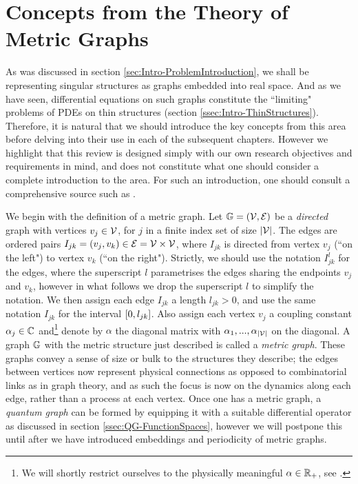 \section{Concepts from the Theory of Metric Graphs} \label{sec:QuantumGraphs}
As was discussed in section \ref{sec:Intro-ProblemIntroduction}, we shall be representing singular structures as graphs embedded into real space.
And as we have seen, differential equations on such graphs constitute the ``limiting" problems of PDEs on thin structures (section \ref{ssec:Intro-ThinStructures}).
Therefore, it is natural that we should introduce the key concepts from this area before delving into their use in each of the subsequent chapters.
However we highlight that this review is designed simply with our own research objectives and requirements in mind, and does not constitute what one should consider a complete introduction to the area.
For such an introduction, one should consult a comprehensive source such as \cite{berkolaiko2013introduction}.

We begin with the definition of a metric graph.
Let $\mathbb{G}=\left( \mathcal{V},\mathcal{E} \right)$ be a \emph{directed} graph with vertices $v_j\in \mathcal{V}$, for $j$ in a finite index set of size $\left\lvert \mathcal{V} \right\rvert$.
The edges are ordered pairs $I_{jk}=\left( v_j, v_k \right)\in \mathcal{E}=\mathcal{V}\times\mathcal{V}$, where $I_{jk}$ is directed from vertex $v_j$ (``on the left") to vertex $v_k$ (``on the right").
Strictly, we should use the notation $I_{jk}^l$ for the edges, where the superscript $l$ parametrises the edges sharing the endpoints $v_j$ and $v_k$, however in what follows we drop the superscript $l$ to simplify the notation.
We then assign each edge $I_{jk}$ a length $l_{jk}>0$, and use the same notation $I_{jk}$ for the interval $\left[ 0,l_{jk} \right]$.
Also assign each vertex $v_j$ a coupling constant $\alpha_j\in\mathbb{C}$ and\footnote{We will shortly restrict ourselves to the physically meaningful $\alpha\in\mathbb{R}_{+}$, see .} denote by $\alpha$ the diagonal matrix with $\alpha_1,...,\alpha_{\left\lvert \mathcal{V} \right\rvert}$ on the diagonal.
A graph $\mathbb{G}$ with the metric structure just described is called a \emph{metric graph}.
These graphs convey a sense of size or bulk to the structures they describe; the edges between vertices now represent physical connections as opposed to combinatorial links as in graph theory, and as such the focus is now on the dynamics along each edge, rather than a process at each vertex.
Once one has a metric graph, a \emph{quantum graph} can be formed by equipping it with a suitable differential operator as discussed in section \ref{ssec:QG-FunctionSpaces}, however we will postpone this until after we have introduced embeddings and periodicity of metric graphs.

